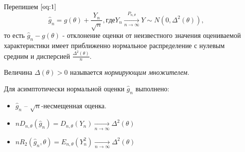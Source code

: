 Перепишем $\ref{eq:1}$
\[
    \hat{g}_n = g(\theta) + \frac{Y_n}{\sqrt{n}}, где Y_n \xrightarrow[n \to \infty]{P_{n, \theta}} Y \sim N(0, \Delta^2(\theta))
,\] то есть
$\hat{g}_n - g(\theta)$ - отклонение оценки от неизвестного значения 
оцениваемой характеристики имеет приближенно нормальное распределение 
с нулевым средним и дисперсией $\frac{\Delta^2(\theta)}{n}$.

\begin{definition}
    Величина $\Delta(\theta) > 0$ называется \textit{нормирующим множителем}.
\end{definition}

\begin{proposition}
    Для асимптотически нормальной оценки $\hat{g}_n$ выполнено:
    \begin{itemize}
        \item $\hat{g}_n$ -- $\sqrt{n}$-несмещенная оценка.
        \item $nD_{n, \theta}(\hat{g}_n) = D_{n, \theta}(Y_n) 
            \xrightarrow[n \to \infty]{} \Delta^2(\theta)$
        \item $nR_2(\hat{g}_n, \theta) = E_{n, \theta}(Y^2_n) 
            \xrightarrow[n \to \infty]{} \Delta^2(\theta)$
    \end{itemize}
\end{proposition}

